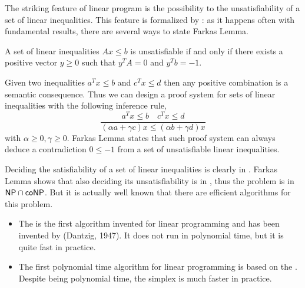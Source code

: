 \documentclass[a4paper,twoside,justified]{tufte-handout}
\begin{document}
The striking feature of linear program is the possibility to
 the unsatisfiability of a set of linear
inequalities. This feature is formalized by : as it happens often with fundamental results, there are
several ways to state Farkas Lemma.

\begin{lemma}
  A set of linear inequalities $ Ax \leq b $ is unsatisfiable if and
  only if there exists a positive vector $ y \geq 0$ such that $
  y^{T}A = 0$ and $y^{T}b = -1$.
\end{lemma}

\begin{marginfigure}
  Given two inequalities $ a^{T}x \leq b $ and $c^{T}x \leq d$
  then any positive combination is a semantic consequence. Thus we can
  design a proof system for sets of linear inequalities with the
  following inference rule,
  \begin{equation*}
    \frac{a^{T}x \leq b \quad c^{T}x \leq d}{(\alpha a + \gamma c)x
      \leq (\alpha b + \gamma d)x  }
  \end{equation*}
  with $\alpha \geq 0, \gamma \geq 0$. Farkas Lemma states that such
  proof system can always deduce a contradiction $ 0 \leq -1 $ from a
  set of unsatisfiable linear inequalities.
\end{marginfigure}

Deciding the satisfiability of a set of linear inequalities is clearly
in \NP\@.  Farkas Lemma shows that also deciding its unsatisfiability
is in \NP, thus the problem is in $ \mathsf{NP} \cap \mathsf{coNP} $. But it is
actually well known that there are efficient algorithms for this problem.
\begin{itemize}
  \item The  is the first algorithm
  invented for linear programming and has been invented by (Dantzig,
  1947). It does not run in polynomial time, but it is quite fast in
  practice.
  \item The first polynomial time algorithm for linear programming is
  based on the . Despite being
  polynomial time, the simplex is much faster in practice.

\end{itemize}
\end{document}
